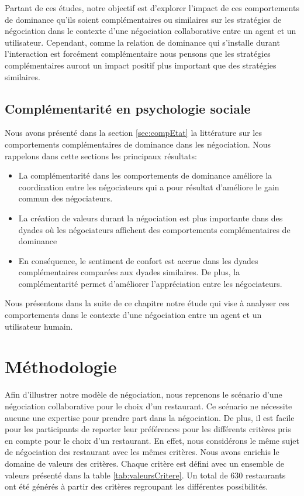 Partant de ces études, notre objectif est d'explorer l'impact de ces comportements de dominance qu'ils soient complémentaires ou similaires sur les stratégies de négociation dans le contexte d'une négociation collaborative entre un agent et un utilisateur. Cependant, comme la relation de dominance qui s'installe durant l'interaction est forcément complémentaire nous pensons que les stratégies complémentaires auront un impact positif plus important que des stratégies similaires.

\subsection{Complémentarité en psychologie sociale}
	Nous avons présenté dans la section \ref{sec:compEtat} la littérature sur les comportements complémentaires de dominance dans les négociation. Nous rappelons dans cette sections les principaux résultats: 
	
	\begin{itemize}
		\item La complémentarité dans les comportements de dominance améliore la coordination entre les négociateurs qui a pour résultat d'améliore le gain commun des négociateurs.
		
		\item La création de valeurs durant la négociation est plus importante dans des dyades où les négociateurs affichent des comportements complémentaires de dominance
		
		\item En conséquence, le sentiment de confort est accrue dans les dyades complémentaires comparées aux dyades similaires. De plus, la complémentarité permet d'améliorer l'appréciation entre les négociateurs.
	\end{itemize}
	

Nous présentons dans la suite de ce chapitre notre étude qui vise à analyser ces comportements dans le contexte d'une négociation entre un agent et un utilisateur humain.

\section{Méthodologie}
\label{sec:methodo}

Afin d'illustrer notre modèle de négociation, nous reprenons le scénario d'une négociation collaborative pour le choix d'un restaurant.
Ce scénario ne nécessite aucune une expertise pour prendre part dans la négociation. De plus, il est facile pour les participants de reporter leur préférences pour les différents critères pris en compte pour le choix d'un restaurant. En effet, nous considérons le même sujet de négociation des restaurant avec les mêmes critères. Nous avons enrichis le domaine de valeurs des critères. Chaque critère est défini avec un ensemble de valeurs présenté dans la table \ref{tab:valeursCritere}. Un total de 630 restaurants ont été générés à partir des critères regroupant les différentes possibilités.

